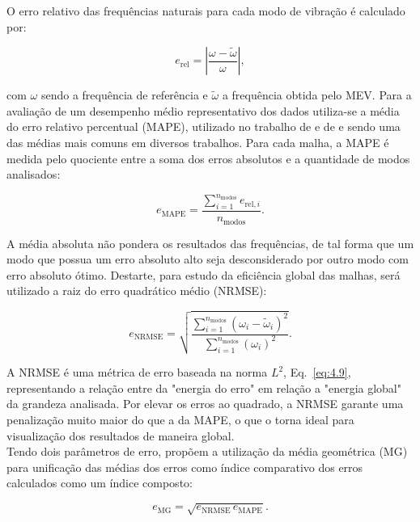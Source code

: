 \indent O erro relativo das frequências naturais para cada modo de vibração é calculado por:

\begin{equation}
    e_{\mathrm{rel}} = \left| \frac{\omega - \tilde{\omega}}{\omega} \right|,
    \label{eq:1.1}
\end{equation}

\noindent com $\omega$ sendo a frequência de referência e $\tilde{\omega}$ a frequência obtida pelo MEV. Para a avaliação de um desempenho médio representativo dos dados utiliza-se a média do erro relativo percentual (MAPE), utilizado no trabalho de \citet{custodio2022metodo} e de \citet{torii2012analise} e sendo uma das médias mais comuns em diversos trabalhos. Para cada malha, a MAPE é medida pelo quociente entre a soma dos erros absolutos e a quantidade de modos analisados:	

\begin{equation}
    e_{\mathrm{MAPE}} = \frac{\sum_{i=1}^{n_{\mathrm{modos}}} e_{\mathrm{rel},i} }{n_{\mathrm{modos}}}.
    \label{eq:1.2}
\end{equation}

\indent A média absoluta não pondera os resultados das frequências, de tal forma que um modo que possua um erro absoluto alto seja desconsiderado por outro modo com erro absoluto ótimo. Destarte, para estudo da eficiência global das malhas, será utilizado a raiz do erro quadrático médio (NRMSE):

\begin{equation}
    e_{\mathrm{NRMSE}} = \sqrt{\frac{\sum_{i=1}^{n_{\mathrm{modos}}} (\omega_i - \tilde{\omega}_i)^2}{\sum_{i=1}^{n_{\mathrm{modos}}} (\omega_i)^2 }}. 
    \label{eq:1.3}
\end{equation}

\indent A NRMSE é uma métrica de erro baseada na norma $L^2$, Eq.~\ref{eq:4.9}, representando a relação entre da "energia do erro" em relação a "energia global" da grandeza analisada. Por elevar os erros ao quadrado, a NRMSE garante uma penalização muito maior do que a da MAPE, o que o torna ideal para visualização dos resultados de maneira global.\\
\indent Tendo dois parâmetros de erro, propõem a utilização da média geométrica (MG) para unificação das médias dos erros como índice comparativo dos erros calculados como um índice composto:

\begin{equation}
    e_{\mathrm{MG}} = \sqrt{e_{\mathrm{NRMSE}} \, e_{\mathrm{MAPE}}}.
    \label{eq:1.4}
\end{equation}

